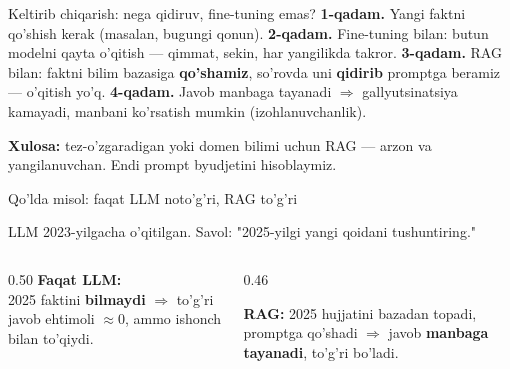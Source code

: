 \documentclass[aspectratio=169,11pt]{beamer}
\begin{document}
\begin{frame}{Keltirib chiqarish: nega qidiruv, fine-tuning emas?}
  \textbf{1-qadam.} Yangi faktni qo'shish kerak (masalan, bugungi qonun).
  \pause
  \textbf{2-qadam.} Fine-tuning bilan: butun modelni qayta o'qitish --- qimmat,
  sekin, har yangilikda takror.
  \pause
  \textbf{3-qadam.} RAG bilan: faktni bilim bazasiga \textbf{qo'shamiz},
  so'rovda uni \textbf{qidirib} promptga beramiz --- o'qitish yo'q.
  \pause
  \textbf{4-qadam.} Javob manbaga tayanadi $\Rightarrow$ gallyutsinatsiya
  kamayadi, manbani ko'rsatish mumkin (izohlanuvchanlik).
  \begin{tcolorbox}[okbox,top=2pt,bottom=2pt]
    \small \textbf{Xulosa:} tez-o'zgaradigan yoki domen bilimi uchun RAG ---
    arzon va yangilanuvchan. Endi prompt byudjetini hisoblaymiz.
  \end{tcolorbox}
\end{frame}

\begin{frame}{Qo'lda misol: faqat LLM noto'g'ri, RAG to'g'ri}
  \begin{tcolorbox}[defbox,title={Bilim kesilishi (knowledge cutoff)}]
    \small LLM 2023-yilgacha o'qitilgan. Savol: "2025-yilgi yangi qoidani tushuntiring."
  \end{tcolorbox}
  \vspace{0.2em}
  \begin{columns}[T]
    \begin{column}{0.50\textwidth}
      \textbf{Faqat LLM:}\\
      \footnotesize
      2025 faktini \textbf{bilmaydi} $\Rightarrow$ to'g'ri javob ehtimoli
      $\approx 0$, ammo ishonch bilan to'qiydi.
    \end{column}
    \begin{column}{0.46\textwidth}
      \begin{tcolorbox}[okbox,top=2pt,bottom=2pt]
        \footnotesize
        \textbf{RAG:} 2025 hujjatini bazadan topadi, promptga qo'shadi
        $\Rightarrow$ javob \textbf{manbaga tayanadi}, to'g'ri bo'ladi.
      \end{tcolorbox}
    \end{column}
  \end{columns}
\end{frame}
\end{document}
